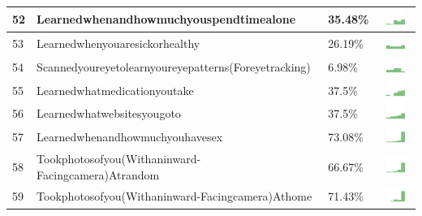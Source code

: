 \begin{table}[t]
\begin{center}
\begin{tabular}{| p{0.5cm} | p{7cm} | p{1cm} | c |}
52 & Learnedwhenandhowmuchyouspendtimealone & 35.48\% & \includegraphics[width = 2cm, height = 0.5cm]{../learnedwhenandhowmuchyouspendtimealoneAPPSERVER} \\ \hline 
53 & Learnedwhenyouaresickorhealthy & 26.19\% & \includegraphics[width = 2cm, height = 0.5cm]{../learnedwhenyouaresickorhealthyAPPSERVER} \\ \hline 
54 & Scannedyoureyetolearnyoureyepatterns(Foreyetracking) & 6.98\% & \includegraphics[width = 2cm, height = 0.5cm]{../scannedyoureyetolearnyoureyepatterns(foreyetracking)APPSERVER} \\ \hline 
55 & Learnedwhatmedicationyoutake & 37.5\% & \includegraphics[width = 2cm, height = 0.5cm]{../learnedwhatmedicationyoutakeAPPSERVER} \\ \hline 
56 & Learnedwhatwebsitesyougoto & 37.5\% & \includegraphics[width = 2cm, height = 0.5cm]{../learnedwhatwebsitesyougotoAPPSERVER} \\ \hline 
57 & Learnedwhenandhowmuchyouhavesex & 73.08\% & \includegraphics[width = 2cm, height = 0.5cm]{../learnedwhenandhowmuchyouhavesexAPPSERVER} \\ \hline 
58 & Tookphotosofyou(Withaninward-Facingcamera)Atrandom & 66.67\% & \includegraphics[width = 2cm, height = 0.5cm]{../tookphotosofyou(withaninward-facingcamera)atrandomAPPSERVER} \\ \hline 
59 & Tookphotosofyou(Withaninward-Facingcamera)Athome & 71.43\% & \includegraphics[width = 2cm, height = 0.5cm]{../tookphotosofyou(withaninward-facingcamera)athomeAPPSERVER} \\ \hline 

\end{tabular}
\end{center}
\end{table}
